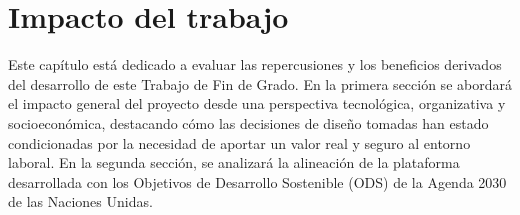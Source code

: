 \chapter{Impacto del trabajo} \label{chp:impacto}
Este capítulo está dedicado a evaluar las repercusiones y los beneficios derivados del desarrollo de este Trabajo de Fin de Grado. En la primera sección se abordará el impacto general del proyecto desde una perspectiva tecnológica, organizativa y socioeconómica, destacando cómo las decisiones de diseño tomadas han estado condicionadas por la necesidad de aportar un valor real y seguro al entorno laboral. En la segunda sección, se analizará la alineación de la plataforma desarrollada con los Objetivos de Desarrollo Sostenible (ODS) de la Agenda 2030 de las Naciones Unidas.
